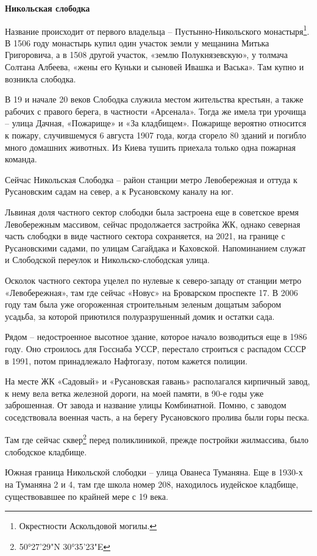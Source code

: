 \medskip


\textbf{Никольская слободка}

Название происходит от первого владельца – Пустынно-Никольского монастыря\footnote{Окрестности Аскольдовой могилы.}. В 1506 году монастырь купил один участок земли у мещанина Митька Григоровича, а в 1508 другой участок, «землю Полукнязевскую», у толмача Солтана Албеева, «жены его Куньки и сыновей Ивашка и Васька». Там купно и возникла слободка.

В 19 и начале 20 веков Слободка служила местом жительства крестьян, а также рабочих с правого берега, в частности «Арсенала». Тогда же имела три урочища – улица Дачная, «Пожарище» и «За кладбищем». Пожарище вероятно относится к пожару, случившемуся 6 августа 1907 года, когда сгорело 80 зданий и погибло много домашних животных. Из Киева тушить приехала только одна пожарная команда.

Сейчас Никольская Слободка – район станции метро Левобережная и оттуда к Русановским садам на север, а к Русановскому каналу на юг.

Львиная доля частного сектор слободки была застроена еще в советское время Левобережным массивом, сейчас продолжается застройка ЖК, однако северная часть слободки в виде частного сектора сохраняется, на 2021, на границе с Русановскими садами, по улицам Сагайдака и Каховской. Напоминанием служат и Слободской переулок и Никольско-слободская улица.

Осколок частного сектора уцелел по нулевые к северо-западу от станции метро «Левобережная», там где сейчас «Новус» на Броварском проспекте 17. В 2006 году там была уже огороженная строительным зеленым дощатым забором усадьба, за которой приютился полуразрушенный домик и остатки сада.

Рядом – недостроенное высотное здание, которое начало возводиться еще в 1986 году. Оно строилось для Госснаба УССР, перестало строиться с распадом СССР в 1991, потом принадлежало Нафтогазу, потом кажется полиции.

На месте ЖК «Садовый» и «Русановская гавань» располагался кирпичный завод, к нему вела ветка железной дороги, на моей памяти, в 90-е годы уже заброшенная. От завода и название улицы Комбинатной. Помню, с заводом соседствовала военная часть, а на берегу Русановского пролива были горы песка.

Там где сейчас сквер\footnote{50°27'29"N 30°35'23"E} перед поликлиникой, прежде постройки жилмассива, было слободское кладбище.

Южная граница Никольской слободки – улица Ованеса Туманяна. Еще в 1930-х на Туманяна 2 и 4, там где школа номер 208, находилось иудейское кладбище, существовавшее по крайней мере с 19 века.

